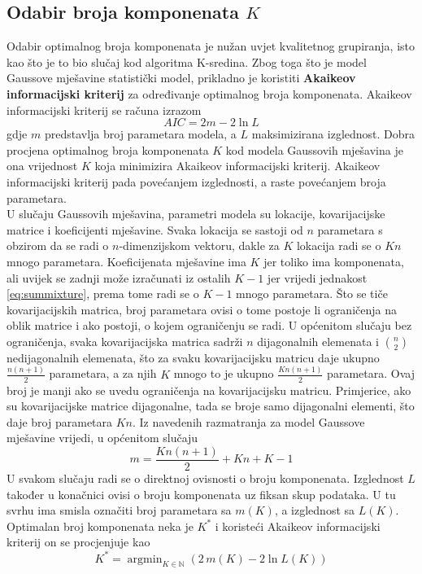 \documentclass[times, utf8, zavrsni]{fer}
\DeclareMathOperator*{\argmin}{argmin}
\begin{document}
\subsection{Odabir broja komponenata $K$}
Odabir optimalnog broja komponenata je nužan uvjet kvalitetnog grupiranja, isto kao što je to bio slučaj kod algoritma K-sredina. Zbog toga što je model Gaussove mješavine statistički model, prikladno je koristiti \textbf{Akaikeov informacijski kriterij}  za određivanje optimalnog broja komponenata. Akaikeov informacijski kriterij se računa izrazom
\[AIC = 2m - 2 \ln{L}\]
gdje $m$ predstavlja broj parametara modela, a $L$ maksimizirana izglednost. Dobra procjena optimalnog broja komponenata $K$ kod modela Gaussovih mješavina je ona vrijednost $K$ koja minimizira Akaikeov informacijski kriterij. Akaikeov informacijski kriterij pada povećanjem izglednosti, a raste povećanjem broja parametara.\\
U slučaju Gaussovih mješavina, parametri modela su lokacije, kovarijacijske matrice i koeficijenti mješavine. Svaka lokacija se sastoji od $n$ parametara s obzirom da se radi o $n$-dimenzijskom vektoru, dakle za $K$ lokacija radi se o $Kn$ mnogo parametara. Koeficijenata mješavine ima $K$ jer toliko ima komponenata, ali uvijek se zadnji može izračunati iz ostalih $K-1$ jer vrijedi jednakost \ref{eq:summixture}, prema tome radi se o $K - 1$ mnogo parametara. Što se tiče kovarijacijskih matrica, broj parametara ovisi o tome postoje li ograničenja na oblik matrice i ako postoji, o kojem ograničenju se radi. U općenitom slučaju bez ograničenja, svaka kovarijacijska matrica sadrži $n$ dijagonalnih elemenata i $\binom{n}{2}$ nedijagonalnih elemenata, što za svaku kovarijacijsku matricu daje ukupno $\frac{n \left(n+1\right)}{2}$ parametara, a za njih $K$ mnogo to je ukupno $\frac{K n \left(n+1\right)}{2}$ parametara. Ovaj broj je manji ako se uvedu ograničenja na kovarijacijsku matricu. Primjerice, ako su kovarijacijske matrice dijagonalne, tada se broje samo dijagonalni elementi, što daje broj parametara $Kn$. Iz navedenih razmatranja za model Gaussove mješavine vrijedi, u općenitom slučaju
\[m = \frac{K n \left(n+1\right)}{2} + K n + K - 1\]
U svakom slučaju radi se o direktnoj ovisnosti o broju komponenata. Izglednost $L$ također u konačnici ovisi o broju komponenata uz fiksan skup podataka. U tu svrhu ima smisla označiti broj parametara sa $m \left(K\right)$, a izglednost sa $L \left(K\right)$. Optimalan broj komponenata neka je $K^{\ast}$ i koristeći Akaikeov informacijski kriterij on se procjenjuje kao
\[K^{\ast} = \argmin_{K \in \mathbb{N}} \left(2 \, m \left(K\right) - 2 \ln{L \left(K\right)}\right)\]
\end{document}

